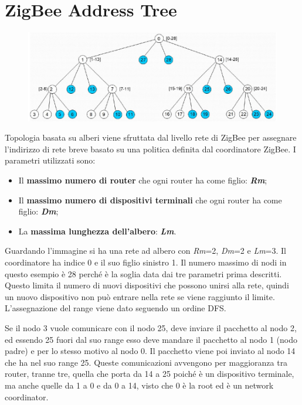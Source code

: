 \section{ZigBee Address Tree}

\begin{figure}[htbp]
   \centering
   \includegraphics{images/questions/Schermata del 2023-10-19 15-35-42.png}
   \label{fig:dom9}
\end{figure}

Topologia basata su alberi viene sfruttata dal livello rete di ZigBee per assegnare l'indirizzo di rete breve basato su una politica definita dal coordinatore ZigBee. I parametri utilizzati sono:

\begin{itemize}
\item Il \textbf{massimo numero di router} che ogni router ha come figlio: \textbf{\emph{Rm}};
\item Il \textbf{massimo numero di dispositivi terminali} che ogni router ha come figlio: \textbf{\emph{Dm}};
\item La \textbf{massima lunghezza dell'albero}: \textbf{\emph{Lm}}.
\end{itemize}

Guardando l'immagine si ha una rete ad albero con \emph{Rm}=2, \emph{Dm}=2 e \emph{Lm}=3. Il coordinatore ha indice 0 e il suo figlio sinistro 1. Il numero massimo di nodi in questo esempio è 28 perché è la soglia data dai tre parametri prima descritti. Questo limita il numero di nuovi dispositivi che possono unirsi alla rete, quindi un nuovo dispositivo non può entrare nella rete se viene raggiunto il limite. L'assegnazione del range viene dato seguendo un ordine DFS.

Se il nodo 3 vuole comunicare con il nodo 25, deve inviare il pacchetto al nodo 2, ed essendo 25 fuori dal suo range esso deve mandare il pacchetto al nodo 1 (nodo padre) e per lo stesso motivo al nodo 0. Il pacchetto viene poi inviato al nodo 14 che ha nel suo range 25. Queste comunicazioni avvengono per maggioranza tra router, tranne tre, quella che porta da 14 a 25 poiché è un dispositivo terminale, ma anche quelle da 1 a 0 e da 0 a 14, visto che 0 è la root ed è un network coordinator.

